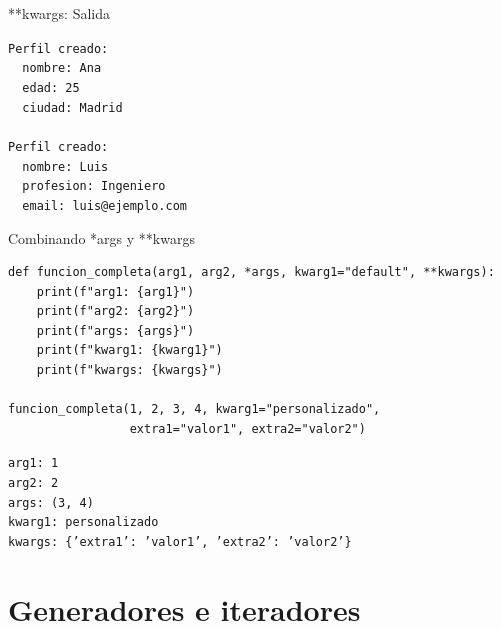 \documentclass{beamer}
\begin{document}
\begin{frame}[fragile]{**kwargs: Salida \faArrowCircleRight}
\begin{tcolorbox}[colback=green!10,colframe=green,title={\small\faArrowCircleRight \ Salida},coltitle=fg0,left=3pt,right=3pt,top=3pt,bottom=3pt,boxsep=2pt]
\small\texttt{Perfil creado:\\
\ \ nombre: Ana\\
\ \ edad: 25\\
\ \ ciudad: Madrid\\
\ \\
Perfil creado:\\
\ \ nombre: Luis\\
\ \ profesion: Ingeniero\\
\ \ email: luis@ejemplo.com}
\end{tcolorbox}
\end{frame}

\begin{frame}[fragile]{Combinando *args y **kwargs \faPuzzlePiece}
\begin{lstlisting}
def funcion_completa(arg1, arg2, *args, kwarg1="default", **kwargs):
    print(f"arg1: {arg1}")
    print(f"arg2: {arg2}")
    print(f"args: {args}")
    print(f"kwarg1: {kwarg1}")
    print(f"kwargs: {kwargs}")

funcion_completa(1, 2, 3, 4, kwarg1="personalizado", 
                 extra1="valor1", extra2="valor2")
\end{lstlisting}

\vspace{-0.2cm}
\begin{tcolorbox}[colback=green!10,colframe=green,title={\small\faArrowCircleRight \ Salida},coltitle=fg0,left=3pt,right=3pt,top=2pt,bottom=2pt,boxsep=1pt]
\tiny\texttt{arg1: 1\\
arg2: 2\\
args: (3, 4)\\
kwarg1: personalizado\\
kwargs: \{'extra1': 'valor1', 'extra2': 'valor2'\}}
\end{tcolorbox}
\end{frame}

\section{Generadores e iteradores}
\end{document}
